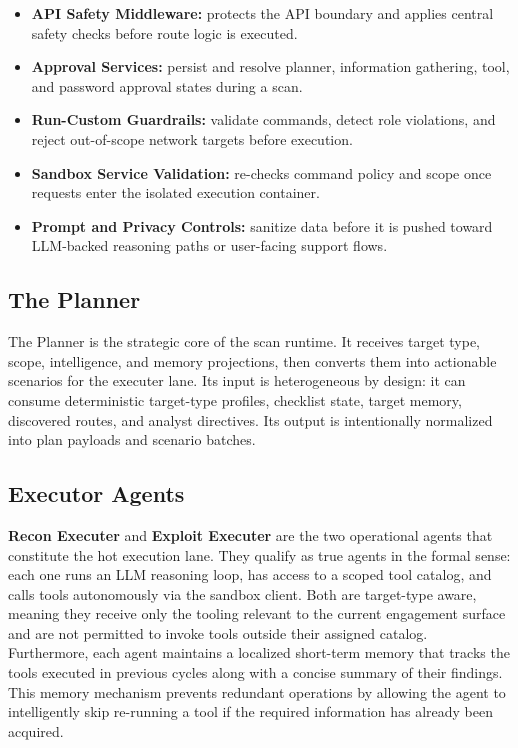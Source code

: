 \documentclass[12pt,a4paper]{report}
\begin{document}
\begin{itemize}
    \item \textbf{API Safety Middleware:} protects the API boundary and applies
    central safety checks before route logic is executed.
    \item \textbf{Approval Services:} persist and resolve planner, information
    gathering, tool, and password approval states during a scan.
    \item \textbf{Run-Custom Guardrails:} validate commands, detect role violations,
    and reject out-of-scope network targets before execution.
    \item \textbf{Sandbox Service Validation:} re-checks command policy and scope
    once requests enter the isolated execution container.
    \item \textbf{Prompt and Privacy Controls:} sanitize data before it is pushed
    toward LLM-backed reasoning paths or user-facing support flows.
\end{itemize}

\subsection{The Planner}

The Planner is the strategic core of the scan runtime. It receives target type,
scope, intelligence, and memory projections, then converts them into actionable
scenarios for the executer lane. Its input is heterogeneous by design: it can
consume deterministic target-type profiles, checklist state, target memory,
discovered routes, and analyst directives. Its output is intentionally normalized
into plan payloads and scenario batches.

\subsection{Executor Agents}

\textbf{Recon Executer} and \textbf{Exploit Executer} are the two operational agents that constitute the hot execution lane. They qualify as true agents in the formal sense: each one runs an LLM reasoning loop, has access to a scoped tool catalog, and calls tools autonomously via the sandbox client. Both are target-type aware, meaning they receive only the tooling relevant to the current engagement surface and are not permitted to invoke tools outside their assigned catalog. Furthermore, each agent maintains a localized short-term memory that tracks the tools executed in previous cycles along with a concise summary of their findings. This memory mechanism prevents redundant operations by allowing the agent to intelligently skip re-running a tool if the required information has already been acquired.
\end{document}
